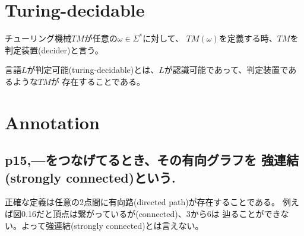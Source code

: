 \documentclass[b5paper,fleqn]{ltjsarticle}
\newcommand\s[1]{\subsection*{#1}\noindent\ignorespaces}
\begin{document}
\section{Turing-decidable}
チューリング機械$TM$が任意の$\omega\in\Sigma^*$に対して、
$TM(\omega)$を定義する時、$TM$を判定装置(decider)と言う。\par
言語$L$が判定可能(turing-decidable)とは、$L$が認識可能であって、判定装置であるような$TM$が
存在することである。

\section{Annotation}

\s{p15,---をつなげてるとき、その有向グラフを
強連結(strongly connected)という.}
正確な定義は任意の2点間に有向路(directed path)が存在することである。
例えば図0.16だと頂点は繋がっているが(connected)、3から6は
辿ることができない。よって強連結(strongly connected)とは言えない。
\end{document}

